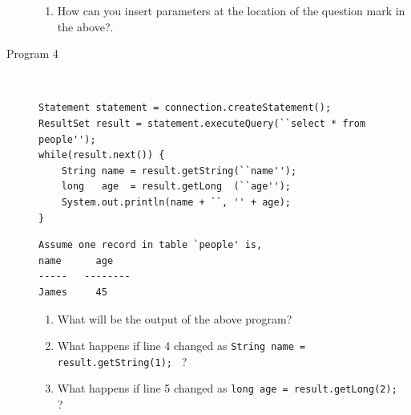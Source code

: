 \documentclass[11pt,a4paper]{article}
\def\AnswerBox{\fbox{\begin{minipage}{4in}\hfill\vspace{0.5in}\end{minipage}}}
\begin{document}
\begin{description}
\AnswerBox

\begin{enumerate}[label=\bfseries Q\arabic*:]\itemsep10pt
\item How can you insert parameters at the location of the question mark in the above?.

\end{enumerate}

\item [Program 4]\
\begin{lstlisting}
Statement statement = connection.createStatement();
ResultSet result = statement.executeQuery(``select * from people'');
while(result.next()) {
    String name = result.getString(``name'');
    long   age  = result.getLong  (``age'');
    System.out.println(name + ``, '' + age);
}
\end{lstlisting}
\begin{verbatim}
Assume one record in table `people' is,
name      age
-----   --------
James     45
\end{verbatim}

\AnswerBox

\begin{enumerate}[label=\bfseries Q\arabic*:]\itemsep10pt
\item What will be the output of the above program?

\item What happens if line 4 changed as \texttt{String name = result.getString(1); } ?

\item What happens if line 5 changed as \texttt{long age = result.getLong(2); } ?
\end{enumerate}

\end{description}
\end{document}
